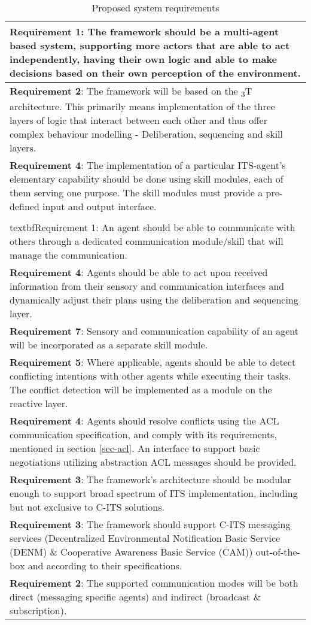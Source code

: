 \documentclass[main.tex]{subfiles}
\begin{document}
\begin{table}[htbp]
    \small
    \caption{Proposed system requirements}
    \centering\begin{tabular}{>{\footnotesize}p{}}
        \toprule 
\textbf{Requirement 1}: The framework should be a multi-agent based system, supporting more actors 
that are able to act independently, having their own logic and able to make decisions based on their 
own perception of the environment.
\\ \midrule
\textbf{Requirement 2}: The framework will be based on the \textsubscript{3}T architecture. 
This primarily means implementation of the three layers of logic that interact between each other and thus 
offer complex behaviour modelling - Deliberation, sequencing and skill layers.
\\ \midrule
\textbf{Requirement 4}: The implementation of a particular ITS-agent's elementary
capability should be done using skill modules, each of them serving one purpose. The skill modules must provide a
pre-defined input and output interface.
\\ \midrule
\\textbf{Requirement 1}: An agent should be able to communicate with others through a dedicated communication module/skill 
that will manage the communication.
\\ \midrule
\textbf{Requirement 4}: Agents should be able to act upon received information from their sensory and communication interfaces
and dynamically adjust their plans using the deliberation and sequencing layer.
\\ \midrule
\textbf{Requirement 7}: Sensory and communication capability of an agent will be incorporated 
as a separate skill module.
\\ \midrule
\textbf{Requirement 5}: Where applicable, agents should be able to detect conflicting intentions with other agents
while executing their tasks. The conflict detection will be implemented as a module on the reactive layer.
\\ \midrule
\textbf{Requirement 4}: Agents should resolve conflicts using the ACL communication
specification, and comply with its requirements, mentioned in section \ref{sec-acl}. An
interface to support basic negotiations utilizing abstraction ACL messages should be provided.
\\ \midrule
\textbf{Requirement 3}: The framework's architecture should be modular enough to support broad 
spectrum of ITS implementation, including but not exclusive to C-ITS solutions.
\\ \midrule
\textbf{Requirement 3}: The framework should support C-ITS messaging services (Decentralized
Environmental Notification Basic Service (DENM) \& Cooperative Awareness Basic Service (CAM))
out-of-the-box and according to their specifications.
\\ \midrule
\textbf{Requirement 2}: The supported communication modes will be both direct (messaging specific agents) and indirect  
(broadcast \& subscription). 
\\ \bottomrule
    \end{tabular}
    \label{sys-requirements}
\end{table}

\clearpage
\end{document}
